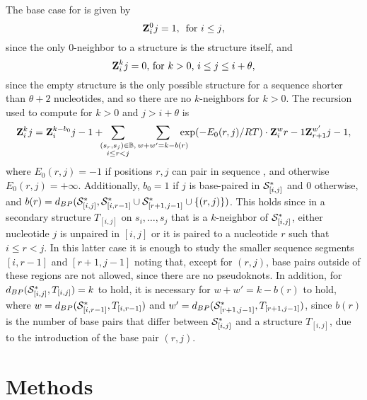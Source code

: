 The base case for  is given by
\begin{equation}
  \bfZ{0}{i}{j} = 1,\, \mbox{ for $i \le j$,}
  \label{eq:Zinit1}
\end{equation}
since the only $0$-neighbor to a structure \strSt
is the structure \strSt itself, and
\begin{equation}
  \bfZ{k}{i}{j} = 0,\, \mbox{for $k > 0$, $i \le j \leq
    i+\theta$},
  \label{eq:Zinit2}
\end{equation}
since the empty structure is the only possible structure for a
sequence shorter than $\theta + 2$ nucleotides, and so there are no
$k$-neighbors for $k>0$. The recursion used to compute
 for $k > 0$ and $j > i+\theta$ is
\begin{equation}
  \bfZ{k}{i}{j} = \bfZ{k -b_0}{i}{j-1} +
  \hspace{-5pt} \sum_{\substack{ (s_r,s_j) \in \mathbb{B}, \\
  i \leq r < j }} \sum_{w+w'=k - b(r)} \hspace{-10pt}
  \exp(-E_0(r,j)/RT) \cdot \bfZ{w}{i}{r-1} \bfZ{w'}{r+1}{j-1},
  \label{eq:N}
\end{equation}
where $E_0(r,j) = -1$ if positions $r,j$ can pair in sequence \seq,
and otherwise $E_0(r,j) = +\infty$. Additionally,
$b_0 = 1$ if $j$ is base-paired
in $\mathcal S^*_{[i,j]}$ and $0$ otherwise, and
$b(r)=d_{BP}(\mathcal S^*_{[i,j]}, \mathcal S^*_{[i,r-1]} \cup \mathcal S^*_{[r+1,j-1]} \cup\{(r,j)\})$.
This holds since in a secondary
structure $T_{[i,j]}$ on $s_i,\ldots,s_j$ that is a $k$-neighbor of
$\mathcal S^*_{[i,j]}$,
either nucleotide $j$ is unpaired in $[i,j]$ or it is
paired to a nucleotide $r$ such that $i \leq r < j$. In this
latter case it is enough to study the smaller sequence segments
$[i,r-1]$ and $[r+1,j-1]$ noting that, except for $(r,j)$,
base pairs outside of these regions are not allowed, since there
are no pseudoknots. In addition,
for $d_{BP}(\mathcal S^*_{[i,j]},T_{[i,j]}) = k$ to hold,
it is necessary for $w+w' = k -b(r)$ to hold, where $w =
d_{BP}(\mathcal S^*_{[i,r-1]},T_{[i,r-1]})$ and $w' =
d_{BP}(\mathcal S^*_{[r+1,j-1]},T_{[r+1,j-1]})$, since $b(r)$ is the
number of base pairs that differ between $\mathcal S^*_{[i,j]}$ and a
structure $T_{[i,j]}$, due to the introduction of the base pair
$(r,j)$.

\section*{Methods}

